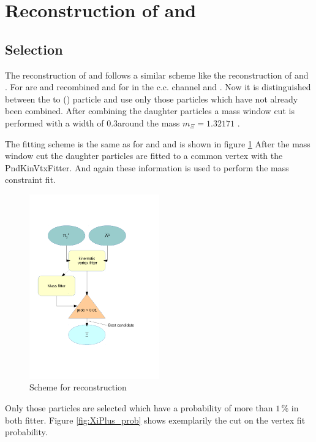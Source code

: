		
	
\section{Reconstruction of \cascade and \anticascade}
	\subsection*{Selection}
		The reconstruction of \cascade and \anticascade follows a similar scheme like the reconstruction of \lam and \alam.
		For \anticascade are \alam and \piplusone recombined and for \cascade in the c.c. channel \lam and \piminusone.
		Now it is distinguished between the to \piplus (\piminus) particle and use only those particles which have not already been combined.
		After combining the daughter particles a mass window cut is performed with a width of $0.3$\massunit around 
		the \cascade mass $m_{\Xi} = 1.32171$ \massunit \cite{PDG}.
		 
		The fitting scheme is the same as for \lam and \alam and is shown in figure \ref{fig:anticascade_scheme} 
		After the mass window cut the daughter particles are fitted to a common vertex with the PndKinVtxFitter.
		And again these information is used to perform the mass constraint fit. 
		
		\begin{figure}
			\centering
				\includegraphics[width=0.50\textwidth]{./plots/combineAntiCascade.pdf}
			\caption{\propose Scheme for \anticascade reconstruction}
			\label{fig:anticascade_scheme}
		\end{figure}
		
		Only those particles are selected which have a \chisq probability of more than $1\,\%$ in both fitter. 
		Figure \ref{fig:XiPlus_prob} shows exemplarily the cut on the vertex fit probability.
		
